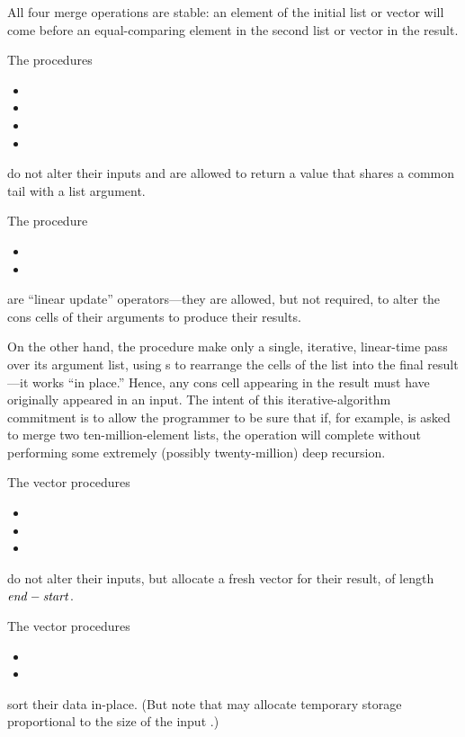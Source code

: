All four merge operations are stable: an element of the initial list
 or vector  will come before an
equal-comparing element in the second list  or vector
 in the result.

The procedures
%
\begin{itemize}
\item {}
\item {}
\item {}
\item {}
\end{itemize}
%
do not alter their inputs and are allowed to return a value that shares 
a common tail with a list argument.

The procedure
\begin{itemize}
\item {}
\item {}
\end{itemize}
%
are ``linear update'' operators---they are allowed, but not required, to
alter the cons cells of their arguments to produce their results. 

On the other hand, the  procedure 
make only a single, iterative, linear-time pass over its argument
list, using s to rearrange the cells of the list
into the final result ---it works ``in place.'' Hence, any cons cell
appearing in the result must have originally appeared in an input. The
intent of this iterative-algorithm commitment is to allow the
programmer to be sure that if, for example,  is asked to
merge two ten-million-element lists, the operation will complete
without performing some extremely (possibly twenty-million) deep
recursion.

The vector procedures
%
\begin{itemize}
\item {}
\item {}
\item {}
\end{itemize}
%
do not alter their inputs, but allocate a fresh vector for their result,
of length $\var{end} - \var{start}$. 

The vector procedures
%
\begin{itemize}
\item {}
\item {}
\end{itemize}
%
sort their data in-place. (But note that 
may allocate temporary storage proportional to the size of the
input
.)


